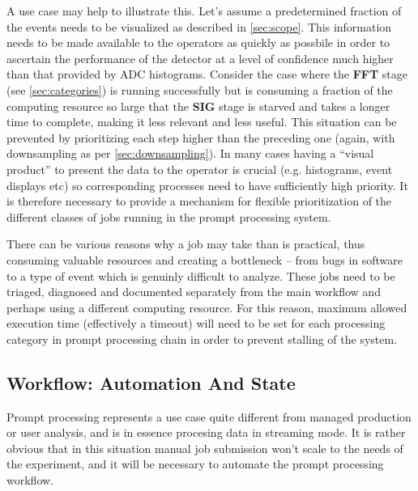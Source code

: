 \documentclass[pdftex,12pt,letter]{article}
\begin{document}
A use case may help to illustrate this. Let's assume a predetermined fraction of the events needs to
be visualized as described in \ref{sec:scope}.
This information needs to be made available to the operators as quickly as possbile in order to ascertain the performance
of the detector at a level of confidence much higher than that provided by ADC histograms.
Consider the case where the \textbf{FFT} stage (see \ref{sec:categories})
is running successfully but is consuming a fraction of the computing resource so large that
the \textbf{SIG} stage is starved and takes a longer time to complete, making
it less relevant and less useful. This situation can be prevented by prioritizing each step higher
than the preceding one (again, with downsampling as per \ref{sec:downsampling}). In many
cases having a ``visual product'' to present the data to the operator is crucial (e.g. histograms,
event displays etc) so corresponding processes need to have sufficiently high priority.
It is therefore necessary to provide a mechanism for flexible prioritization of the different
classes of jobs running in the prompt processing system.

There can be various reasons why a job may take than is practical, thus consuming valuable resources
and creating a bottleneck -- from bugs in software to a type of event which is genuinly difficult to analyze.
These jobs need to be triaged, diagnosed and documented separately from the main workflow and perhaps
using a different computing resource. For this reason, maximum allowed execution time (effectively a timeout)
will need to be set for each processing category in prompt processing chain in order to prevent stalling of the system.


\subsection{Workflow: Automation And State}

Prompt processing represents a use case quite different from managed production or user analysis, and is 
in essence procesing data in streaming mode. It is rather obvious that in this situation manual job submission won't scale to the
needs of the experiment, and it will be necessary to automate the prompt processing workflow.
\end{document}
